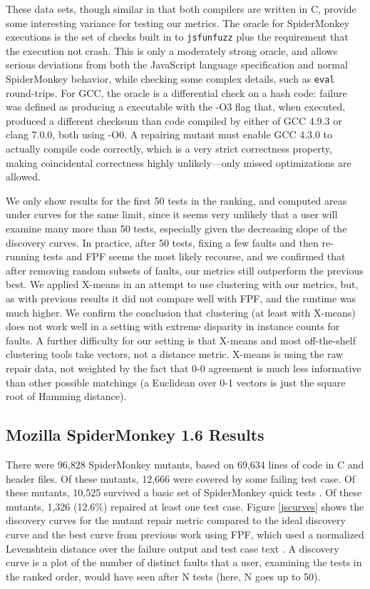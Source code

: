 These data sets, though similar in that both compilers are written in C, provide some interesting variance for testing our metrics.  The oracle for SpiderMonkey executions is the set of checks built in to {\tt jsfunfuzz} plus the requirement that the execution not crash.  This is only a moderately strong oracle, and allows serious deviations from both the JavaScript language specification and normal SpiderMonkey behavior, while checking some complex details, such as {\tt eval} round-trips.  For GCC, the oracle is a differential check on a hash code:  failure was defined as producing a executable with the -O3 flag that, when executed, produced a different checksum than code compiled by either of GCC 4.9.3 or clang 7.0.0, both using -O0.  A repairing mutant must enable GCC 4.3.0 to actually compile code correctly, which is a very strict correctness property, making coincidental correctness \cite{CCT} highly unlikely---only missed optimizations are allowed.

We only show results for the first 50 tests in the ranking, and computed areas under curves for the same limit, since it seems very unlikely that a user will examine many more than 50 tests, especially given the decreasing slope of the discovery curves.  In practice, after 50 tests, fixing a few faults and then re-running tests and FPF seems the most likely recourse, and we confirmed that after removing random subsets of faults, our metrics still outperform the previous best.  We applied X-means \cite{xmeans} in an attempt to use clustering with our metrics, but, as with previous results \cite{PLDI13} it did not compare well with FPF, and the runtime was much higher.  We confirm the conclusion \cite{PLDI13} that clustering (at least with X-means) does not work well in a setting with extreme disparity in instance counts for faults.  A further difficulty for our setting is that X-means and most off-the-shelf clustering tools take vectors, not a distance metric.  X-means is using the raw repair data, not weighted by the fact that 0-0 agreement is much less informative than other possible matchings (a Euclidean over 0-1 vectors is just the square root of Hamming distance).

\subsection{Mozilla SpiderMonkey 1.6 Results}


There were 96,828 SpiderMonkey mutants, based on 69,634 lines of code in C and header files.  Of these mutants, 12,666 were covered by some failing test case.  Of these mutants, 10,525 survived a basic set of SpiderMonkey quick tests \cite{icst2014}.  Of these mutants, 1,326 (12.6\%) repaired at least one test case.  Figure \ref{jscurves} shows the discovery curves for the mutant repair metric compared to the ideal discovery curve and the best curve from previous work using FPF, which used a normalized Levenshtein distance \cite{lev} over the failure output and test case text \cite{PLDI13}.  A discovery curve is a plot of the number of distinct faults that a user, examining the tests in the ranked order, would have seen after N tests (here, N goes up to 50).

